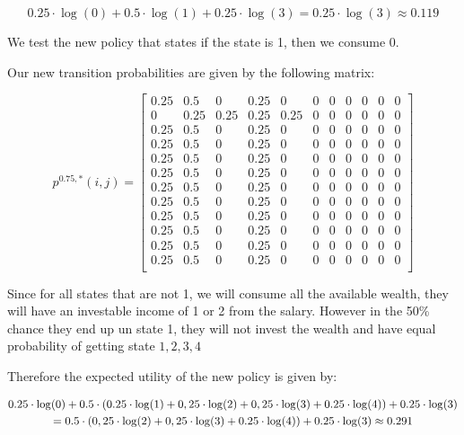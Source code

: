 \documentclass[12pt]{article}
\begin{document}
$$ 0.25	\cdot \log(0) + 0.5 \cdot \log(1) + 0.25 \cdot \log(3) =0.25 \cdot \log(3) \approx 0.119 $$

We test the new policy that states if the state is 1, then we consume 0.

Our new transition probabilities are given by the following matrix:

$$
	p^{0.75,*}(i,j) =
	\begin{bmatrix}
		0.25 & 0.5  & 0    & 0.25 & 0    & 0 & 0 & 0 & 0 & 0 & 0 \\
		0    & 0.25 & 0.25 & 0.25 & 0.25 & 0 & 0 & 0 & 0 & 0 & 0 \\
		0.25 & 0.5  & 0    & 0.25 & 0    & 0 & 0 & 0 & 0 & 0 & 0 \\
		0.25 & 0.5  & 0    & 0.25 & 0    & 0 & 0 & 0 & 0 & 0 & 0 \\
		0.25 & 0.5  & 0    & 0.25 & 0    & 0 & 0 & 0 & 0 & 0 & 0 \\
		0.25 & 0.5  & 0    & 0.25 & 0    & 0 & 0 & 0 & 0 & 0 & 0 \\
		0.25 & 0.5  & 0    & 0.25 & 0    & 0 & 0 & 0 & 0 & 0 & 0 \\
		0.25 & 0.5  & 0    & 0.25 & 0    & 0 & 0 & 0 & 0 & 0 & 0 \\
		0.25 & 0.5  & 0    & 0.25 & 0    & 0 & 0 & 0 & 0 & 0 & 0 \\
		0.25 & 0.5  & 0    & 0.25 & 0    & 0 & 0 & 0 & 0 & 0 & 0 \\
		0.25 & 0.5  & 0    & 0.25 & 0    & 0 & 0 & 0 & 0 & 0 & 0 \\
		0.25 & 0.5  & 0    & 0.25 & 0    & 0 & 0 & 0 & 0 & 0 & 0 \\

	\end{bmatrix}
$$

Since for all states that are not 1, we will consume all the available wealth,
they will have an investable income of 1 or 2 from the salary. However in the
50\% chance they end up un state 1, they will not invest the wealth and have
equal probability of getting state ${1,2,3,4}$

Therefore the expected utility of the new policy is given by:

\begin{multline*}
	$$
		0.25 \cdot \log(0)
		+ 0.5 \cdot \left(0.25\cdot \log(1)
		+ 0,25\cdot \log(2) +0,25 \cdot \log(3) + 0.25\cdot \log(4)\right)
		+ 0.25 \cdot \log(3)  \\= 0.5 \cdot \left(0,25\cdot \log(2) +0,25 \cdot \log(3) + 0.25\cdot \log(4)\right)
		+ 0.25 \cdot \log(3) \approx 0.291
	$$
\end{multline*}
\end{document}

